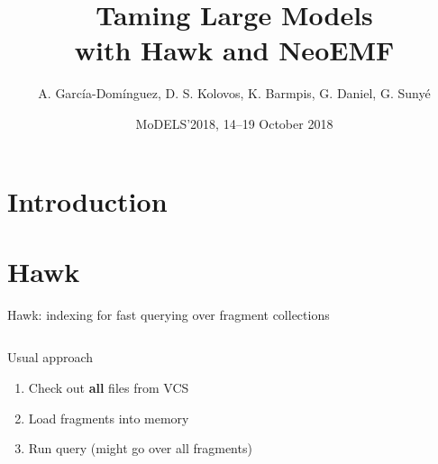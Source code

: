 \documentclass[10pt]{beamer}
\title{Taming Large Models\\with Hawk and NeoEMF}
\date{MoDELS'2018, 14--19 October 2018}
\author{A. García-Domínguez, D. S. Kolovos, K. Barmpis, G. Daniel, G. Sunyé}
\begin{document}
\maketitle

\section{Introduction}

\section{Hawk}

\begin{frame}{Hawk: indexing for fast querying over fragment collections}
  \centering

  \begin{columns}[t]
    \centering
    \begin{block}{Usual approach}
      \begin{enumerate}
      \item Check out \textbf{all} files from VCS
      \item Load fragments into memory
      \item Run query (might go over all fragments)
      \end{enumerate}
    \end{block}


\end{columns}
\end{frame}
\end{document}
